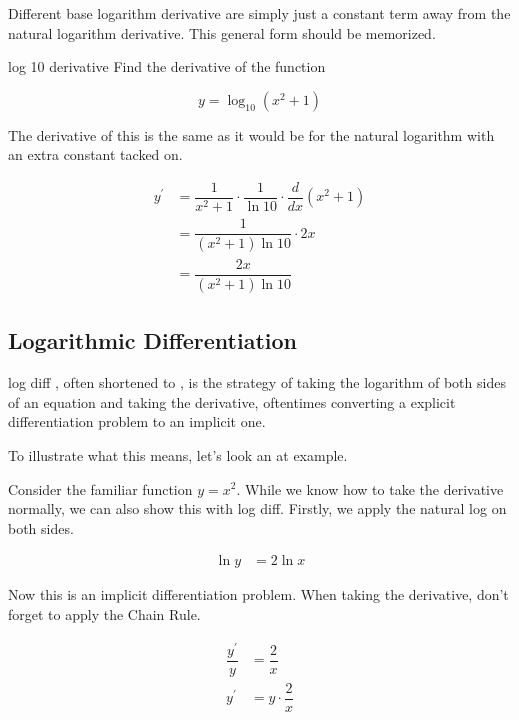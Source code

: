 Different base logarithm derivative are simply just a constant term away from the natural logarithm derivative. This general form should be memorized.

\begin{example}{log 10 derivative}
    Find the derivative of the function
    
    \[ y = \log_{10}{\left( x^2 + 1 \right)} \]
    
    \vspace{0.3cm}
    
    The derivative of this is the same as it would be for the natural logarithm with an extra constant tacked on.
    
    \begin{align}
        y^\prime &= \dfrac{1}{x^2 + 1} \cdot \dfrac{1}{\ln{10}} \cdot \dfrac{d}{dx} \left( x^2 + 1 \right) \\
        &= \dfrac{1}{\left( x^2 + 1 \right) \ln{10}} \cdot 2x \\
        &= \dfrac{2x}{\left( x^2 + 1 \right) \ln{10}}
    \end{align}
\end{example}

\subsection{Logarithmic Differentiation}

\begin{definition}{log diff}
    , often shortened to , is the strategy of taking the logarithm of both sides of an equation and taking the derivative, oftentimes converting a explicit differentiation problem to an implicit one.
\end{definition}

To illustrate what this means, let's look an at example.

Consider the familiar function \( y = x^2 \). While we know how to take the derivative normally, we can also show this with log diff. Firstly, we apply the natural log on both sides.
    
\begin{align}
    \ln{y} &= 2 \ln{x}
\end{align}

Now this is an implicit differentiation problem. When taking the derivative, don't forget to apply the Chain Rule.

\begin{align}
    \dfrac{y^\prime}{y} &= \dfrac{2}{x} \\
    y^\prime &= y \cdot \dfrac{2}{x}
\end{align}

